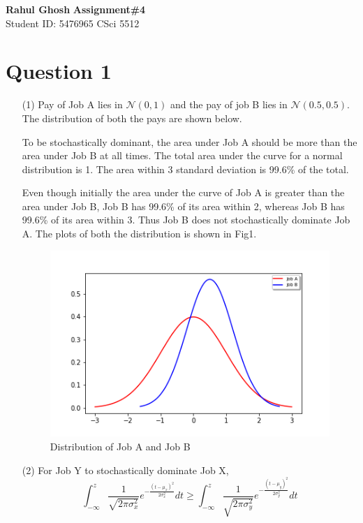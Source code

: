 \documentclass[letter, 10pt]{article}
\begin{document}
\noindent
\large \textbf{Rahul Ghosh} \hfill \textbf{Assignment\#4}\\
\normalsize Student ID: 5476965 \hfill CSci 5512\\

\section*{Question 1}
\begin{itemize}
    \item[(1)] Pay of Job A lies in $\mathcal{N}(0,1)$ and the pay of job B lies in $\mathcal{N}(0.5,0.5)$. The distribution of both the pays are shown below.

    To be stochastically dominant, the area under Job A should be more than the area under Job B at all times. The total area under the curve for a normal distribution is 1. The area within 3 standard deviation is 99.6\% of the total.
    
    Even though initially the area under the curve of Job A is greater than the area under Job B, Job B has 99.6\% of its area within 2, whereas Job B has 99.6\% of its area within 3. Thus Job B does not stochastically dominate Job A. The plots of both the distribution is shown in Fig1.
    
    \begin{figure}[H]
        \centering
        \includegraphics[width=\textwidth, height=0.5\textwidth]{HW4/P1.png}
        \caption{Distribution of Job A and Job B}
    \end{figure}
    
    \item[(2)] For Job Y to stochastically dominate Job X,
    \begin{equation*}
        \int_{-\infty}^{z} \frac{1}{\sqrt{2\pi\sigma_x^2}}e^{-\frac{(t-\mu_x)^2}{2\sigma_x^2}}dt \geq \int_{-\infty}^{z} \frac{1}{\sqrt{2\pi\sigma_y^2}}e^{-\frac{(t-\mu_y)^2}{2\sigma_y^2}}dt
    \end{equation*}
    

\end{itemize}
\end{document}
